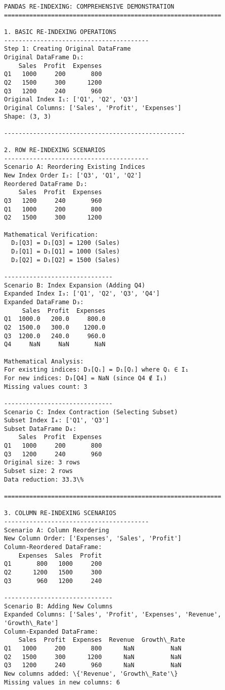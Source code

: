 \documentclass[11pt]{article}
\begin{document}
    \begin{Verbatim}[commandchars=\\\{\}]
PANDAS RE-INDEXING: COMPREHENSIVE DEMONSTRATION
============================================================

1. BASIC RE-INDEXING OPERATIONS
----------------------------------------
Step 1: Creating Original DataFrame
Original DataFrame D₁:
    Sales  Profit  Expenses
Q1   1000     200       800
Q2   1500     300      1200
Q3   1200     240       960
Original Index I₁: ['Q1', 'Q2', 'Q3']
Original Columns: ['Sales', 'Profit', 'Expenses']
Shape: (3, 3)

--------------------------------------------------

2. ROW RE-INDEXING SCENARIOS
----------------------------------------
Scenario A: Reordering Existing Indices
New Index Order I₂: ['Q3', 'Q1', 'Q2']
Reordered DataFrame D₂:
    Sales  Profit  Expenses
Q3   1200     240       960
Q1   1000     200       800
Q2   1500     300      1200

Mathematical Verification:
  D₂[Q3] = D₁[Q3] = 1200 (Sales)
  D₂[Q1] = D₁[Q1] = 1000 (Sales)
  D₂[Q2] = D₁[Q2] = 1500 (Sales)

------------------------------
Scenario B: Index Expansion (Adding Q4)
Expanded Index I₃: ['Q1', 'Q2', 'Q3', 'Q4']
Expanded DataFrame D₃:
     Sales  Profit  Expenses
Q1  1000.0   200.0     800.0
Q2  1500.0   300.0    1200.0
Q3  1200.0   240.0     960.0
Q4     NaN     NaN       NaN

Mathematical Analysis:
For existing indices: D₃[Qᵢ] = D₁[Qᵢ] where Qᵢ ∈ I₁
For new indices: D₃[Q4] = NaN (since Q4 ∉ I₁)
Missing values count: 3

------------------------------
Scenario C: Index Contraction (Selecting Subset)
Subset Index I₄: ['Q1', 'Q3']
Subset DataFrame D₄:
    Sales  Profit  Expenses
Q1   1000     200       800
Q3   1200     240       960
Original size: 3 rows
Subset size: 2 rows
Data reduction: 33.3\%

============================================================

3. COLUMN RE-INDEXING SCENARIOS
----------------------------------------
Scenario A: Column Reordering
New Column Order: ['Expenses', 'Sales', 'Profit']
Column-Reordered DataFrame:
    Expenses  Sales  Profit
Q1       800   1000     200
Q2      1200   1500     300
Q3       960   1200     240

------------------------------
Scenario B: Adding New Columns
Expanded Columns: ['Sales', 'Profit', 'Expenses', 'Revenue', 'Growth\_Rate']
Column-Expanded DataFrame:
    Sales  Profit  Expenses  Revenue  Growth\_Rate
Q1   1000     200       800      NaN          NaN
Q2   1500     300      1200      NaN          NaN
Q3   1200     240       960      NaN          NaN
New columns added: \{'Revenue', 'Growth\_Rate'\}
Missing values in new columns: 6


\end{Verbatim}
\end{document}
